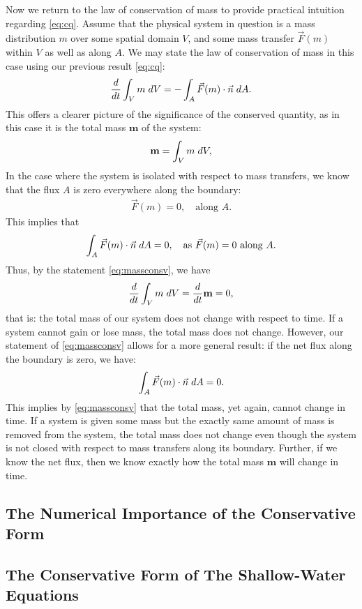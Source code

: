 \documentclass[../main.tex]{subfiles}
\begin{document}
\noindent Now we return to the law of conservation of mass to provide practical intuition regarding \ref{eq:cq}. Assume that the physical system in question is a mass distribution $m$ over some spatial domain $V$, and some mass transfer $\vec F(m)$ within $V$ as well as along $A$. We may state the law of conservation of mass in this case using our previous result \ref{eq:cq}:
\begin{gather}\label{eq:massconsv}
    \frac{d}{dt} \int_V m\hspace*{0.10 cm} dV = - \int_A \vec F(m) \cdot \vec n \hspace*{0.10 cm}dA.
\end{gather}
This offers a clearer picture of the significance of the conserved quantity, as in this case it is the total mass $\mathbf{m}$ of the system:
\begin{gather*}
    \mathbf{m} = \int_V m \hspace*{0.10 cm }dV,
\end{gather*}
In the case where the system is isolated with respect to mass transfers, we know that the flux $A$ is zero everywhere along the boundary:
\begin{gather*}
    \vec F(m) = 0,\quad\text{along } A.
\end{gather*}
This implies that
\begin{gather*}
    \int_A \vec F(m) \cdot \vec n \hspace*{0.10 cm}dA = 0,\quad\text{as } \vec F(m) = 0\text{ along } A.\\
\end{gather*}
Thus, by the statement \ref{eq:massconsv}, we have
\begin{gather*}
    \frac{d}{dt}\int_V m\hspace*{0.10 cm} dV = \frac{d}{dt}\mathbf{m} = 0,
\end{gather*}
that is: the total mass of our system does not change with respect to time. If a system cannot gain or lose mass, the total mass does not change. However, our statement of \ref{eq:massconsv} allows for a more general result: if the net flux along the boundary is zero, we have:
\begin{gather*}
    \int_A \vec F(m) \cdot \vec n \hspace*{0.10 cm}dA = 0.
\end{gather*}
This implies by \ref{eq:massconsv} that the total mass, yet again, cannot change in time. If a system is given some mass but the exactly same amount of mass is removed from the system, the total mass does not change even though the system is not closed with respect to mass transfers along its boundary. Further, if we know the net flux, then we know exactly how the total mass $\mathbf{m}$ will change in time.

\subsection{The Numerical Importance of the Conservative Form}

\subsection{The Conservative Form of The Shallow-Water Equations}
\end{document}
